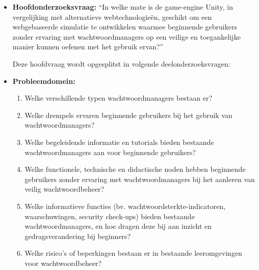 \begin{itemize}
De centrale onderzoeksvraag luidt: \item \colorbox{hoofdvraag}{\parbox{\dimexpr\linewidth-2\fboxsep}{\textbf{Hoofdonderzoeksvraag:} ``In welke mate is de game-engine Unity, in vergelijking met alternatieve webtechnologieën, geschikt om een webgebaseerde simulatie te ontwikkelen waarmee beginnende gebruikers zonder ervaring met wachtwoordmanagers op een veilige en toegankelijke manier kunnen oefenen met het gebruik ervan?''}}
Deze hoofdvraag wordt opgesplitst in volgende deelonderzoeksvragen:


    \item \colorbox{deelvraagprobleem}{\parbox{\dimexpr\linewidth-2\fboxsep}{\textbf{Probleemdomein:}
    \begin{enumerate}
        \item Welke verschillende typen wachtwoordmanagers bestaan er?
        \item Welke drempels ervaren beginnende gebruikers bij het gebruik van wachtwoordmanagers?
        \item Welke begeleidende informatie en tutorials bieden bestaande wachtwoordmanagers aan voor beginnende gebruikers?
        \item Welke functionele, technische en didactische noden hebben beginnende gebruikers zonder ervaring met wachtwoordmanagers bij het aanleren van veilig wachtwoordbeheer?
        \item Welke informatieve functies (bv. wachtwoordsterkte-indicatoren, waarschuwingen, security check-ups) bieden bestaande wachtwoordmanagers, en hoe dragen deze bij aan inzicht en gedragsverandering bij beginners?
        \item Welke risico’s of beperkingen bestaan er in bestaande leeromgevingen voor wachtwoordbeheer?
    \end{enumerate}}}
    

\end{itemize}
